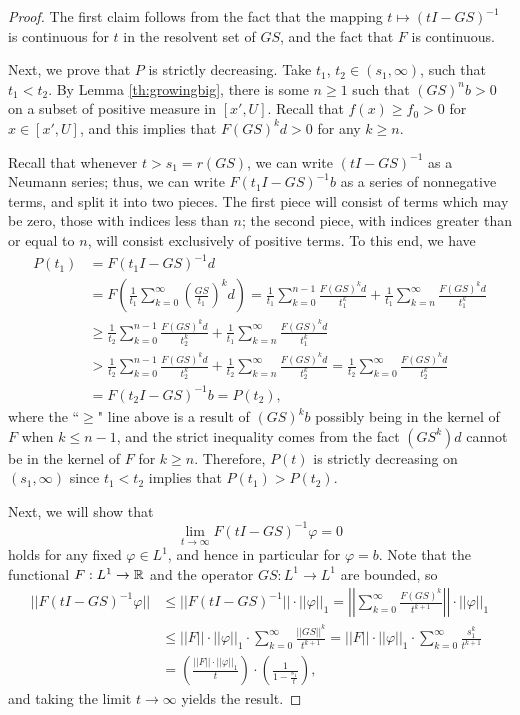\begin{proof}
	The first claim follows from the fact that the mapping $t \mapsto (t I-GS)^{-1}$ is continuous for $t$ in the resolvent set of $GS$, and the fact that $F$ is continuous.
	
	Next, we prove that $P$ is strictly decreasing. Take $t_1$, $t_2 \in (s_1, \infty)$, such that $t_1 < t_2$. By Lemma \ref{th:growingbig}, there is some $n \geq 1$ such that $(GS)^n b>0$ on a subset of positive measure in $[x',U]$. Recall that $f(x) \geq f_0 >0$ for $x \in [x',U]$, and this implies that $F(GS)^k d>0$ for any $k \geq n$. 
	
	Recall that whenever $t>s_1 = r(GS)$, we can write $(t I-GS)^{-1}$ as a Neumann series; thus, we can write $F(t_1 I - GS)^{-1}b$ as a series of nonnegative terms, and split it into two pieces. The first piece will consist of terms which may be zero, those with indices less than $n$; the second piece, with indices greater than or equal to $n$, will consist exclusively of positive terms. To this end, we have
	\begin{align*}
		P(t_1) &= F(t_1 I - GS)^{-1} d \\
		&= F \left( \frac{1}{t_1} \sum_{k=0}^\infty \left( \frac{GS}{t_1} \right)^k d \right) = \frac{1}{t_1} \sum_{k=0}^{n-1} \frac{F(GS)^kd}{t_1^k} + \frac{1}{t_1} \sum_{k=n}^\infty \frac{F(GS)^kd}{t_1^k} \\
		&\geq \frac{1}{t_2} \sum_{k=0}^{n-1} \frac{F(GS)^kd}{t_2^k} + \frac{1}{t_1} \sum_{k=n}^\infty \frac{F(GS)^kd}{t_1^k} \\
		&> \frac{1}{t_2} \sum_{k=0}^{n-1} \frac{F(GS)^kd}{t_2^k} + \frac{1}{t_2} \sum_{k=n}^\infty \frac{F(GS)^kd}{t_2^k} = \frac{1}{t_2} \sum_{k=0}^\infty \frac{F(GS)^kd}{t_2^k} \\
		&=F(t_2I-GS)^{-1}b =P(t_2),
	\end{align*}
	where the ``$\geq$" line above is a result of $(GS)^k b$ possibly being in the kernel of $F$ when $k \leq n-1$, and the strict inequality comes from the fact $(GS^k)d$ cannot be in the kernel of $F$ for $k \geq n$. Therefore, $P(t)$ is strictly decreasing on $(s_1, \infty)$ since $t_1 < t_2$ implies that $P(t_1) > P(t_2)$.
	
	Next, we will show that 
	\[\lim_{t \to \infty} F(t I - GS)^{-1} \varphi = 0 \]
	holds for any fixed $\varphi \in L^1$, and hence in particular for $\varphi = b$. Note that the functional $F:L^1 \to \mathbb{R}$ and the operator $GS:L^1 \to L^1$ are bounded, so
	\begin{align*}
		||F(t I - GS)^{-1} \varphi|| &\leq ||F(t I -GS)^{-1}|| \cdot ||\varphi||_1 = \left|\left| \sum_{k=0}^\infty \frac{F(GS)^k}{t^{k+1}} \right| \right| \cdot ||\varphi||_1 \\
		&\leq ||F|| \cdot ||\varphi||_1 \cdot \sum_{k=0}^\infty \frac{||GS||^k}{t^{k+1}} =||F|| \cdot ||\varphi||_1 \cdot \sum_{k=0}^\infty \frac{s_1^k}{t^{k+1}} \\
		&=\left(\frac{||F|| \cdot ||\varphi||_1}{t} \right) \cdot \left( \frac{1}{1-\frac{s_1}{t}} \right),
	\end{align*}
	and taking the limit $t \to \infty$ yields the result.
	

\end{proof}
